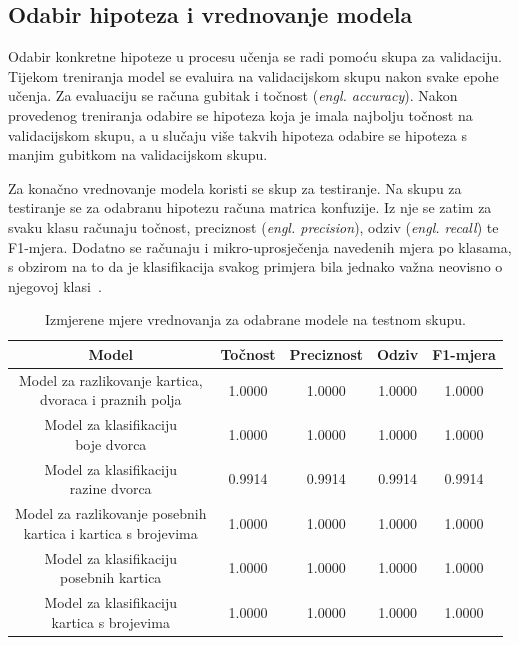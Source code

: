 \documentclass[diplomskirad]{fer}
\begin{document}
		\subsection{Odabir hipoteza i vrednovanje modela}
		\label{podpog:odabir_i_vrednovanje}
			Odabir konkretne hipoteze u procesu učenja se radi pomoću skupa za validaciju. Tijekom treniranja model se evaluira na validacijskom skupu nakon svake epohe učenja. Za evaluaciju se računa gubitak i točnost (\textit{engl. accuracy}). Nakon provedenog treniranja odabire se hipoteza koja je imala najbolju točnost na validacijskom skupu, a u slučaju više takvih hipoteza odabire se hipoteza s manjim gubitkom na validacijskom skupu.
			
			Za konačno vrednovanje modela koristi se skup za testiranje. Na skupu za testiranje se za odabranu hipotezu računa matrica konfuzije. Iz nje se zatim za svaku klasu računaju točnost, preciznost (\textit{engl. precision}), odziv (\textit{engl. recall}) te F1-mjera. Dodatno se računaju i mikro-uprosječenja navedenih mjera po klasama, s obzirom na to da je klasifikacija svakog primjera bila jednako važna neovisno o njegovoj klasi~\cite{Snajder2022VrednovanjeModela}.
			
			\begin{table}[htb]
				\centering
				\caption{Izmjerene mjere vrednovanja za odabrane modele na testnom skupu.}
				\label{tab:rezultati_modela}
				\begin{adjustbox}{width=0.84\textwidth}
					\begin{tabular}{ccccc}
						\toprule
						\textbf{Model} & \textbf{Točnost} & \textbf{Preciznost} & \textbf{Odziv} & \textbf{F1-mjera} \\
						\midrule
						
						\makecell{Model za razlikovanje kartica,\\ dvoraca i praznih polja} & 1.0000 & 1.0000 & 1.0000 & 1.0000 \\[5mm]
						\makecell{Model za klasifikaciju\\boje dvorca} & 1.0000 & 1.0000 & 1.0000 & 1.0000 \\[5mm]
						\makecell{Model za klasifikaciju\\razine dvorca} & 0.9914 & 0.9914 & 0.9914 & 0.9914 \\[5mm]
						\makecell{Model za razlikovanje posebnih\\kartica i kartica s brojevima} & 1.0000 & 1.0000 & 1.0000 & 1.0000 \\[5mm]
						\makecell{Model za klasifikaciju\\posebnih kartica} & 1.0000 & 1.0000 & 1.0000 & 1.0000 \\[5mm] %
						\makecell{Model za klasifikaciju\\kartica s brojevima} & 1.0000 & 1.0000 & 1.0000 & 1.0000 \\
						
						\bottomrule
					\end{tabular}
				\end{adjustbox}
			\end{table}
			
\end{document}

